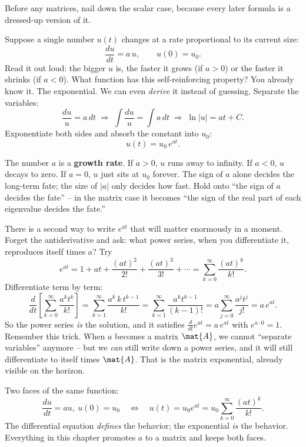 Before any matrices, nail down the scalar case, because every later
formula is a dressed-up version of it.

Suppose a single number $u(t)$ changes at a rate proportional to its current
size:
\[
  \frac{du}{dt} = a\,u, \qquad u(0) = u_0.
\]
Read it out loud: the bigger $u$ is, the faster it grows (if $a > 0$) or the
faster it shrinks (if $a < 0$). What function has this self-reinforcing property?
You already know it. The exponential. We can even \emph{derive} it instead of
guessing. Separate the variables:
\[
  \frac{du}{u} = a\,dt
  \;\Longrightarrow\;
  \int \frac{du}{u} = \int a\,dt
  \;\Longrightarrow\;
  \ln|u| = a t + C.
\]
Exponentiate both sides and absorb the constant into $u_0$:
\[
  \boxed{\,u(t) = u_0\, e^{a t}.\,}
\]

\begin{intuitionbox}
The number $a$ is a \textbf{growth rate}. If $a > 0$, $u$ runs away to infinity.
If $a < 0$, $u$ decays to zero. If $a = 0$, $u$ just sits at $u_0$ forever. The
sign of $a$ alone decides the long-term fate; the size of $|a|$ only decides how
fast. Hold onto ``the sign of $a$ decides the fate'' -- in the matrix case it
becomes ``the sign of the real part of each eigenvalue decides the fate.''
\end{intuitionbox}

There is a second way to write $e^{at}$ that will matter enormously in a moment.
Forget the antiderivative and ask: what power series, when you differentiate it,
reproduces itself times $a$? Try
\[
  e^{at} = 1 + at + \frac{(at)^2}{2!} + \frac{(at)^3}{3!} + \cdots
         = \sum_{k=0}^{\infty} \frac{(at)^k}{k!}.
\]
Differentiate term by term:
\[
  \frac{d}{dt}\!\left[\sum_{k=0}^\infty \frac{a^k t^k}{k!}\right]
  = \sum_{k=1}^\infty \frac{a^k\, k\, t^{k-1}}{k!}
  = \sum_{k=1}^\infty \frac{a^k t^{k-1}}{(k-1)!}
  = a\sum_{j=0}^\infty \frac{a^j t^{j}}{j!}
  = a\, e^{at}.
\]
So the power series \emph{is} the solution, and it satisfies $\frac{d}{dt}e^{at}
= a\,e^{at}$ with $e^{a\cdot 0} = 1$. Remember this trick. When $a$ becomes a
matrix $\mat{A}$, we cannot ``separate variables'' anymore -- but we \emph{can}
still write down a power series, and it will still differentiate to itself times
$\mat{A}$. That is the matrix exponential, already visible on the horizon.

\begin{focusbox}
Two faces of the same function:
\[
  \frac{du}{dt} = a u,\ u(0)=u_0
  \quad\Longleftrightarrow\quad
  u(t) = u_0 e^{at} = u_0\sum_{k=0}^\infty \frac{(at)^k}{k!}.
\]
The differential equation \emph{defines} the behavior; the exponential
\emph{is} the behavior. Everything in this chapter promotes $a$ to a matrix and
keeps both faces.
\end{focusbox}

